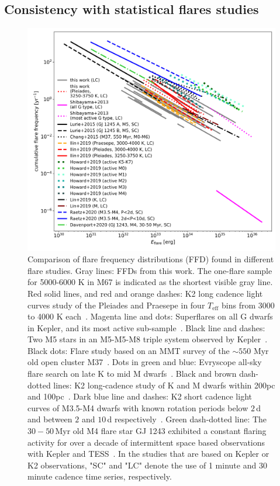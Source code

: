 \documentclass{aa}
\begin{document}
\subsection{Consistency with statistical flares studies}
\label{sec:consistency_other_work}
\begin{figure}[ht!]
    \centering
    \includegraphics[width=13.5cm]{pics/FFDs/discussion_FFDs.png}
    \caption{Comparison of flare frequency distributions (FFD) found in different flare studies. Gray lines: FFDs from this work. The one-flare sample for 5000-6000 K in M67 is indicated as the shortest visible gray line. Red solid lines, and red and orange dashes: K2 long cadence light curves study of the Pleiades and Praesepe in four $T_\mathrm{eff}$ bins from 3000 to 4000 K each~. Magenta line and dots: Superflares on all G dwarfs in Kepler, and its most active sub-sample~\citep{shibayama2013}. Black line and dashes: Two M5 stars in an M5-M5-M8 triple system observed by Kepler~\citep{lurie2015}. Black dots: Flare study based on an MMT survey of the $\sim550$ Myr old open cluster M37~\citep{chang2015}. Dots in green and blue: Evryscope all-sky flare search on late K to mid M dwarfs~\citep{howard2019}. Black and brown dash-dotted lines: K2 long-cadence study of K and M dwarfs within 200pc and 100pc~\citep{lin2019}. Dark blue line and dashes: K2 short cadence light curves of M3.5-M4 dwarfs with known rotation periods below $2\,$d and between $2$ and $10\,$d respectively~\citep{raetz2020}. Green dash-dotted line: The $30-50$\,Myr old M4 flare star GJ 1243 exhibited a constant flaring activity for over a decade of intermittent space based observations with Kepler and TESS~\citep{davenport2020arxiv}. In the studies that are based on Kepler or K2 observations, "SC" and "LC" denote the use of 1 minute and 30 minute cadence time series, respectively.}      
    \label{fig:otherwork}
\end{figure}
\end{document}
